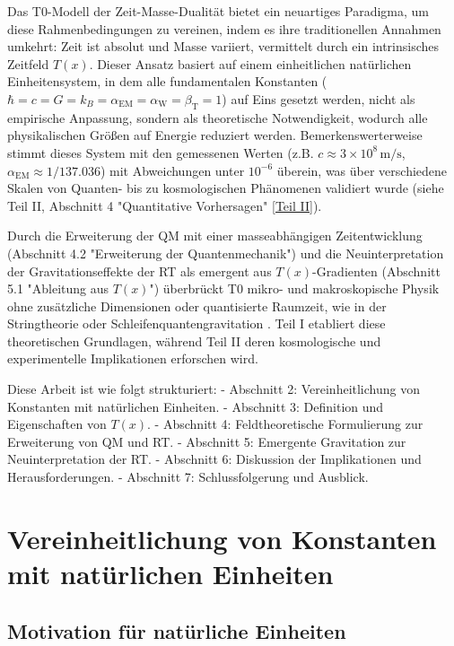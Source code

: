 \documentclass[12pt,a4paper]{article}
\newcommand{\Tfield}{T(x)}
\newcommand{\alphaEM}{\alpha_{\text{EM}}}
\newcommand{\alphaW}{\alpha_{\text{W}}}
\newcommand{\betaT}{\beta_{\text{T}}}
\begin{document}
	Das T0-Modell der Zeit-Masse-Dualität bietet ein neuartiges Paradigma, um diese Rahmenbedingungen zu vereinen, indem es ihre traditionellen Annahmen umkehrt: Zeit ist absolut und Masse variiert, vermittelt durch ein intrinsisches Zeitfeld \(\Tfield\). Dieser Ansatz basiert auf einem einheitlichen natürlichen Einheitensystem, in dem alle fundamentalen Konstanten (\(\hbar = c = G = k_B = \alphaEM = \alphaW = \betaT = 1\)) auf Eins gesetzt werden, nicht als empirische Anpassung, sondern als theoretische Notwendigkeit, wodurch alle physikalischen Größen auf Energie reduziert werden. Bemerkenswerterweise stimmt dieses System mit den gemessenen Werten (z.B. \(c \approx 3 \times 10^8 \, \text{m/s}\), \(\alphaEM \approx 1/137.036\)) mit Abweichungen unter \(10^{-6}\) überein, was über verschiedene Skalen von Quanten- bis zu kosmologischen Phänomenen validiert wurde (siehe Teil II, Abschnitt 4 "Quantitative Vorhersagen" \href{https://github.com/jpascher/T0-Time-Mass-Duality/tree/main/2/pdf/Deutsch/QMRelTimeMassPart2.pdf}{[Teil II]}).
	
	Durch die Erweiterung der QM mit einer masseabhängigen Zeitentwicklung (Abschnitt 4.2 "Erweiterung der Quantenmechanik") und die Neuinterpretation der Gravitationseffekte der RT als emergent aus \(\Tfield\)-Gradienten (Abschnitt 5.1 "Ableitung aus \(\Tfield\)") überbrückt T0 mikro- und makroskopische Physik ohne zusätzliche Dimensionen oder quantisierte Raumzeit, wie in der Stringtheorie oder Schleifenquantengravitation \cite{Greene2020,tHooft1993}. Teil I etabliert diese theoretischen Grundlagen, während Teil II deren kosmologische und experimentelle Implikationen erforschen wird.
	
	Diese Arbeit ist wie folgt strukturiert:
	- Abschnitt 2: Vereinheitlichung von Konstanten mit natürlichen Einheiten.
	- Abschnitt 3: Definition und Eigenschaften von \(\Tfield\).
	- Abschnitt 4: Feldtheoretische Formulierung zur Erweiterung von QM und RT.
	- Abschnitt 5: Emergente Gravitation zur Neuinterpretation der RT.
	- Abschnitt 6: Diskussion der Implikationen und Herausforderungen.
	- Abschnitt 7: Schlussfolgerung und Ausblick.
	
	\section{Vereinheitlichung von Konstanten mit natürlichen Einheiten}
	\label{sec:unified_units}
	
	\subsection{Motivation für natürliche Einheiten}
	\label{subsec:motivation_units}
	
\end{document}
